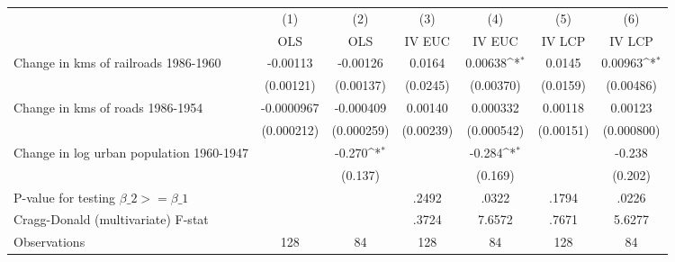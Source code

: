 {
\def\sym#1{\ifmmode^{#1}\else\(^{#1}\)\fi}
\begin{tabular}{l*{6}{c}}
\hline\hline
                &\multicolumn{1}{c}{(1)}&\multicolumn{1}{c}{(2)}&\multicolumn{1}{c}{(3)}&\multicolumn{1}{c}{(4)}&\multicolumn{1}{c}{(5)}&\multicolumn{1}{c}{(6)}\\
                &\multicolumn{1}{c}{OLS}&\multicolumn{1}{c}{OLS}&\multicolumn{1}{c}{IV EUC}&\multicolumn{1}{c}{IV EUC}&\multicolumn{1}{c}{IV LCP}&\multicolumn{1}{c}{IV LCP}\\
\hline
Change in kms of railroads 1986-1960& -0.00113         & -0.00126         &   0.0164         &  0.00638\sym{*}  &   0.0145         &  0.00963\sym{*}  \\
                &(0.00121)         &(0.00137)         & (0.0245)         &(0.00370)         & (0.0159)         &(0.00486)         \\
[1em]
Change in kms of roads 1986-1954&-0.0000967         &-0.000409         &  0.00140         & 0.000332         &  0.00118         &  0.00123         \\
                &(0.000212)         &(0.000259)         &(0.00239)         &(0.000542)         &(0.00151)         &(0.000800)         \\
[1em]
Change in log urban population 1960-1947&                  &   -0.270\sym{*}  &                  &   -0.284\sym{*}  &                  &   -0.238         \\
                &                  &  (0.137)         &                  &  (0.169)         &                  &  (0.202)         \\
\hline
P-value for testing $\beta\_{2} >= \beta\_{1}$&                  &                  &    .2492         &    .0322         &    .1794         &    .0226         \\
Cragg-Donald (multivariate) F-stat&                  &                  &    .3724         &   7.6572         &    .7671         &   5.6277         \\
Observations    &      128         &       84         &      128         &       84         &      128         &       84         \\
\hline\hline
\end{tabular}
}
